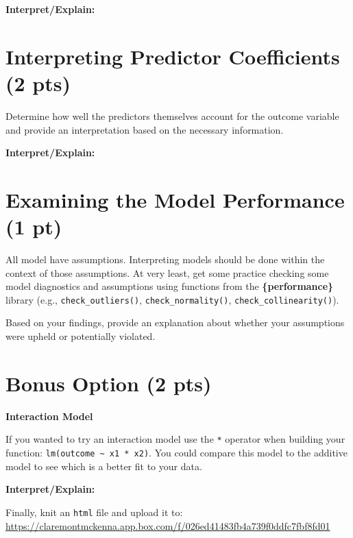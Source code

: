 \documentclass[
]{article}
\begin{document}
\textbf{Interpret/Explain:}

\hypertarget{interpreting-predictor-coefficients-2-pts}{%
\section{\texorpdfstring{\textbf{Interpreting Predictor Coefficients} (2
pts)}{Interpreting Predictor Coefficients (2 pts)}}\label{interpreting-predictor-coefficients-2-pts}}

Determine how well the predictors themselves account for the outcome
variable and provide an interpretation based on the necessary
information.

\textbf{Interpret/Explain:}

\hypertarget{examining-the-model-performance-1-pt}{%
\section{\texorpdfstring{\textbf{Examining the Model Performance} (1
pt)}{Examining the Model Performance (1 pt)}}\label{examining-the-model-performance-1-pt}}

All model have assumptions. Interpreting models should be done within
the context of those assumptions. At very least, get some practice
checking some model diagnostics and assumptions using functions from the
\textbf{\{performance\}} library (e.g., \texttt{check\_outliers()},
\texttt{check\_normality()}, \texttt{check\_collinearity()}).

Based on your findings, provide an explanation about whether your
assumptions were upheld or potentially violated.

\hypertarget{bonus-option-2-pts}{%
\section{\texorpdfstring{\textbf{Bonus Option} (2
pts)}{Bonus Option (2 pts)}}\label{bonus-option-2-pts}}

\textbf{Interaction Model}

If you wanted to try an interaction model use the \texttt{*} operator
when building your function:
\texttt{lm(outcome\ \textasciitilde{}\ x1\ *\ x2)}. You could compare
this model to the additive model to see which is a better fit to your
data.

\textbf{Interpret/Explain:}

Finally, knit an \texttt{html} file and upload it to:
\url{https://claremontmckenna.app.box.com/f/026ed41483fb4a739f0ddfc7fbf8fd01}
\end{document}
